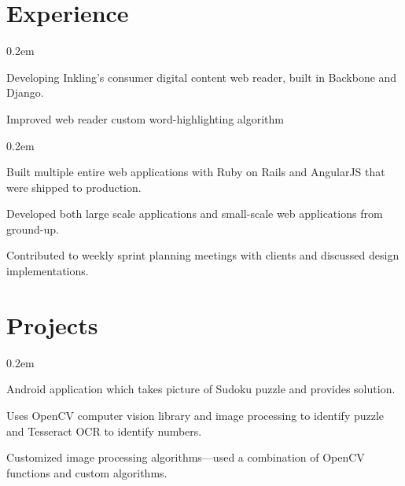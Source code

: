 \documentclass[]{deedy-resume}
\begin{document}
\hfill
\begin{minipage}[t]{0.66\textwidth}


\section{Experience}

\vspace{\topsep}
\begin{tightemize}\itemsep0.2em
\item Developing Inkling's consumer digital content web reader, built in Backbone and Django.
\item Improved web reader custom word-highlighting algorithm
\end{tightemize}


\begin{tightemize}\itemsep0.2em
\item Built multiple entire web applications with Ruby on Rails and AngularJS that were shipped to production.
\item Developed both large scale applications and small-scale web applications from ground-up.
\item Contributed to weekly sprint planning meetings with clients and discussed design implementations.
\end{tightemize}

\sectionsep


\section{Projects}
\begin{tightemize}\itemsep0.2em
\item Android application which takes picture of Sudoku puzzle and provides solution.
\item Uses OpenCV computer vision library and image processing to identify puzzle and Tesseract OCR to
identify numbers.
\item Customized image processing algorithms—used a combination of OpenCV functions and custom
  algorithms.
\end{tightemize}
\sectionsep


\end{minipage}
\end{document}
